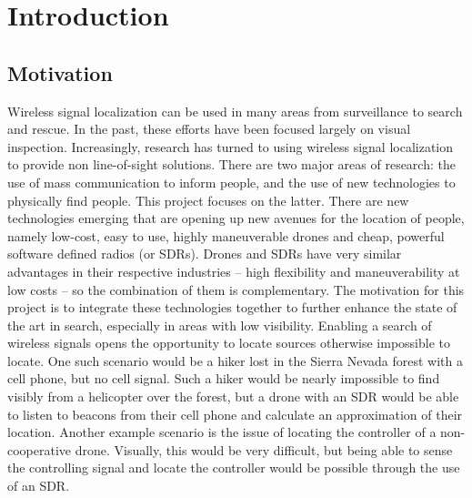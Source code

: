 \chapter{Introduction}

\section{Motivation}
Wireless signal localization can be used in many areas from surveillance to search and rescue. In the past, these efforts have been focused largely on visual inspection. Increasingly, research has turned to using wireless signal localization to provide non line-of-sight solutions. There are two major areas of research: the use of mass communication to inform people, and the use of new technologies to physically find people. This project focuses on the latter. There are new technologies emerging that are opening up new avenues for the location of people, namely low-cost, easy to use, highly maneuverable drones and cheap, powerful software defined radios (or SDRs).
Drones and SDRs have very similar advantages in their respective industries – high flexibility and maneuverability at low costs – so the combination of them is complementary. The motivation for this project is to integrate these technologies together to further enhance the state of the art in search, especially in areas with low visibility. Enabling a search of wireless signals opens the opportunity to locate sources otherwise impossible to locate. One such scenario would be a hiker lost in the Sierra Nevada forest with a cell phone, but no cell signal. Such a hiker would be nearly impossible to find visibly from a helicopter over the forest, but a drone with an SDR would be able to listen to beacons from their cell phone and calculate an approximation of their location. Another example scenario is the issue of locating the controller of a non-cooperative drone. Visually, this would be very difficult, but being able to sense the controlling signal and locate the controller would be possible through the use of an SDR.\par
